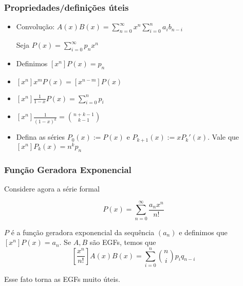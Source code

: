 \documentclass{beamer}
\begin{document}
\begin{frame}
\frametitle{Propriedades/definições úteis}
      \begin{itemize}
            \setlength\itemsep{1.2em}
            \item Convolução: $A(x)B(x) = \sum_{n=0}^{\infty} x^n \sum_{i=0}^{n} a_i b_{n-i}$ 

            \vspace{0.3em}

            Seja $P(x) = \sum_{i=0}^\infty p_n x^n$

            \item Definimos $[x^n] P(x) = p_n$

            \item $[x^n] x^m P(x) = [x^{n-m}] P(x)$

            \item $[x^n]\frac{1}{1-x} P(x) = \sum_{i=0}^n p_i$

            \item $[x^n] \frac{1}{(1-x)^k} = \binom{n+k-1}{k-1}$

            \item Defina as séries $P_0(x) := P(x)$ e $P_{k+1}(x) := xP_k'(x)$. Vale que $[x^n] P_k(x) = n^k p_n$

      \end{itemize}
\end{frame}

\begin{frame}
\frametitle{Função Geradora Exponencial}
      Considere agora a série formal

      $$
      P(x) = \sum_{n=0}^{\infty} \frac{a_n x^n}{n!}
      $$

      $P$ é a função geradora exponencial da sequência $(a_n)$ e definimos que $[x^n] P(x) = a_n$.
      Se $A, B$ são EGFs, temos que 
      $$[\frac{x^n}{n!}] A(x) B(x) = \sum_{i=0}^{n} \binom{n}{i} p_i q_{n-i}$$

      Esse fato torna as EGFs muito úteis.
\end{frame}
\end{document}
